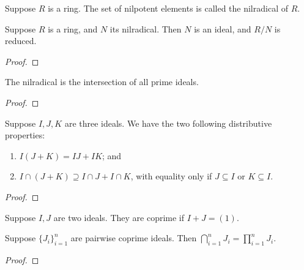 \begin{definition}
    Suppose \(R\) is a ring.
    The set of nilpotent elements is called the nilradical of \(R\).
\end{definition}
\begin{theorem}
    Suppose \(R\) is a ring, and \(N\) its nilradical.
    Then \(N\) is an ideal, and \(R/N\) is reduced.
\end{theorem}
\begin{proof}
    
\end{proof}
\begin{theorem}
    The nilradical is the intersection of all prime ideals.
\end{theorem}
\begin{proof}
    
\end{proof}
\begin{proposition}
    Suppose \(I,J,K\) are three ideals.
    We have the two following distributive properties:
    \begin{enumerate}[label={(\alph*)}, itemsep=0mm]
        \item \(I(J+K) = IJ + IK\); and
        \item \(I \cap (J+K) \supseteq I \cap J + I \cap K\),
            with equality only if \(J \subseteq I\) or \(K \subseteq I\).
    \end{enumerate}
\end{proposition}
\begin{proof}
    
\end{proof}

\begin{definition}
    Suppose \(I,J\) are two ideals.
    They are coprime if \(I+J = (1)\).
\end{definition}
\begin{theorem}
    Suppose \({\{J_i\}}_{i=1}^n\) are pairwise coprime ideals.
    Then \(\bigcap_{i=1}^n J_i = \prod_{i=1}^n J_i\).
\end{theorem}
\begin{proof}
    
\end{proof}

